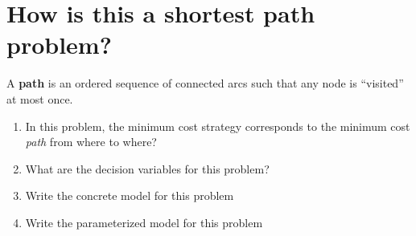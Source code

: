 \documentclass[11pt]{article}
\theoremstyle{definition}
\begin{document}
\section{How is this a \textbf{shortest path} problem?}

\begin{tcolorbox}
A \textbf{path} is an ordered sequence of connected arcs such that any node is ``visited'' at most once.
\end{tcolorbox}

\begin{enumerate}
\item In this problem, the minimum cost strategy corresponds to the minimum cost \emph{path} from where to where? \vspace{1in}

\item What are the decision variables for this problem? \newpage
\item Write the concrete model for this problem \newpage 
\item Write the parameterized model for this problem \newpage
\end{enumerate}
\end{document}
